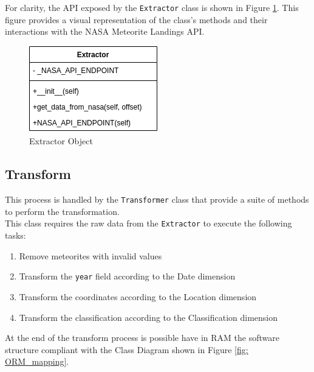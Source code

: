 \documentclass[conference]{IEEEtran}
\begin{document}
	For clarity, the API exposed by the \texttt{Extractor} class is shown in Figure \ref{fig:Extractor}. This figure provides a visual representation of the class's methods and their interactions with the NASA Meteorite Landings API.
	\begin{figure}[htpb]
		\centering
		\includegraphics[width=0.5\columnwidth]{images/Extractor.png}
		\caption{Extractor Object}
		\label{fig:Extractor}
	\end{figure}

	\subsection{Transform}
	This process is handled by the \texttt{Transformer} class that provide a suite of methods to perform the transformation.\\ This class requires the raw data from the \texttt{Extractor} to execute the following tasks:
	\begin{enumerate}
		\item Remove meteorites with invalid values
		\item Transform the \texttt{year} field according to the Date dimension
		\item Transform the coordinates according to the Location dimension
		\item Transform the classification according to the Classification dimension
	\end{enumerate}
	
	At the end of the transform process is possible have in RAM the software structure compliant with the Class Diagram shown in Figure \ref{fig: ORM_mapping}.\\
	
\end{document}
